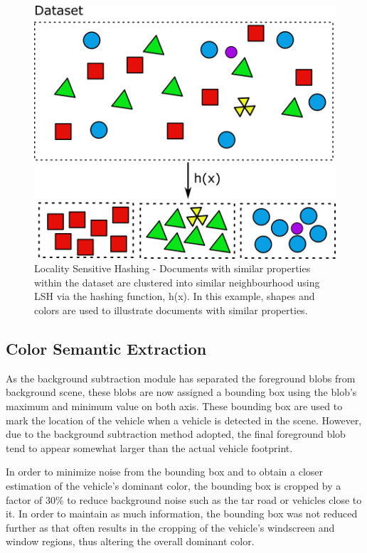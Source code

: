 \begin{figure}[hbt!]\centering
\includegraphics[width=.7\textwidth]{image/lsh.png}
\caption{Locality Sensitive Hashing - Documents with similar properties within the dataset are clustered into similar neighbourhood using LSH via the hashing function, h(x). In this example, shapes and colors are used to illustrate documents with similar properties.}
\label{fig:lshexample}
\end{figure}



\subsection{Color Semantic Extraction }
\label{section:versionOneColorExtract}

As the background subtraction module has separated the foreground blobs from background scene, these blobs are now assigned a bounding box using the blob's maximum and minimum value on both axis. These bounding box are used to mark the location of the vehicle when a vehicle is detected in the scene. However, due to the background subtraction method adopted, the final foreground blob tend to appear somewhat larger than the actual vehicle footprint. 

In order to minimize noise from the bounding box and to obtain a closer estimation of the vehicle's dominant color, the bounding box is cropped by a factor of 30\% to reduce background noise such as the tar road or vehicles close to it. In order to maintain as much information, the bounding box was not reduced further as that often results in the cropping of the vehicle's windscreen and window regions, thus altering the overall dominant color.

